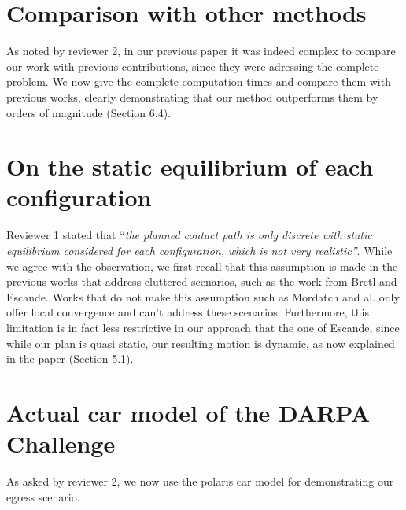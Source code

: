 \documentclass[a4paper]{article}
\begin{document}
\section{Comparison with other methods}
As noted by reviewer 2, in our previous paper it was indeed complex to compare our work with previous contributions,
since they were adressing the complete problem. We now give the complete computation times and compare them with previous works,
clearly demonstrating that our method outperforms them by orders of magnitude (Section 6.4).


\section{On the static equilibrium of each configuration}
Reviewer 1 stated that ``\textit{the planned contact path is only discrete with static equilibrium considered for each
configuration, which is not very realistic''}. While we agree with the observation, we first recall that this assumption is made in the previous works that address cluttered scenarios, such as the work from Bretl and Escande. Works that do not make this assumption such as Mordatch and al. only offer local convergence and can't address these scenarios. Furthermore, this limitation is in fact less restrictive in our approach that the one of Escande, since while our plan is quasi static, our resulting motion is dynamic, as now explained in the paper (Section 5.1). 

\section{Actual car model of the DARPA Challenge}
As asked by reviewer 2, we now use the polaris car model for demonstrating our egress scenario.
\end{document}

